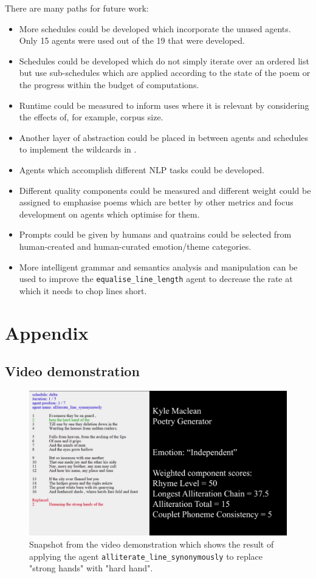 \documentclass[a4paper,10pt]{article}
\begin{document}
There are many paths for future work:
\begin{itemize}
\item More schedules could be developed which incorporate the unused agents. Only 15 agents were used out of the 19 that were developed.
\item Schedules could be developed which do not simply iterate over an ordered list but use sub-schedules which are applied according to the state of the poem or the progress within the budget of computations.
\item Runtime could be measured to inform uses where it is relevant by considering the effects of, for example, corpus size.
\item Another layer of abstraction could be placed in between agents and schedules to implement the wildcards in \cite{VealeCreativeLanguageRetrieval}.
\item Agents which accomplish different NLP tasks could be developed.
\item Different quality components could be measured and different weight could be assigned to emphasise poems which are better by other metrics and focus development on agents which optimise for them.
\item Prompts could be given by humans and quatrains could be selected from human-created and human-curated emotion/theme categories.
\item More intelligent grammar and semantics analysis and manipulation can be used to improve the \texttt{equalise\_line\_length} agent to decrease the rate at which it needs to chop lines short.
\end{itemize}


\section{Appendix}

\subsection{Video demonstration}

\begin{figure}[htb!]
\centering
\includegraphics[width=1\textwidth]{media/demo-snapshot.png}
\caption{Snapshot from the video demonstration which shows the result of applying the agent \texttt{alliterate\_line\_synonymously} to replace "strong hands" with "hard hand".}
\label{fig:demo-snapshot}
\end{figure}
\end{document}

